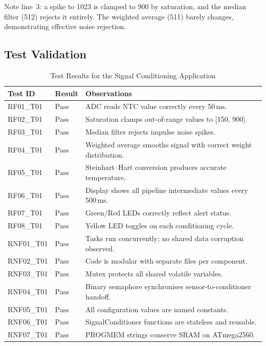 \documentclass[12pt]{article}
\begin{document}
Note line~3: a spike to 1023 is clamped to 900 by saturation, and the median filter (512) rejects it entirely. The weighted average (511) barely changes, demonstrating effective noise rejection.

\subsection{Test Validation}

\begin{table}[H]
\centering
\begin{tabular}{@{}llp{7.5cm}@{}}
\toprule
\textbf{Test ID} & \textbf{Result} & \textbf{Observations} \\
\midrule
RF01\_T01  & Pass & ADC reads NTC value correctly every 50\,ms. \\
RF02\_T01  & Pass & Saturation clamps out-of-range values to [150, 900]. \\
RF03\_T01  & Pass & Median filter rejects impulse noise spikes. \\
RF04\_T01  & Pass & Weighted average smooths signal with correct weight distribution. \\
RF05\_T01  & Pass & Steinhart--Hart conversion produces accurate temperature. \\
RF06\_T01  & Pass & Display shows all pipeline intermediate values every 500\,ms. \\
RF07\_T01  & Pass & Green/Red LEDs correctly reflect alert status. \\
RF08\_T01  & Pass & Yellow LED toggles on each conditioning cycle. \\
RNF01\_T01 & Pass & Tasks run concurrently; no shared data corruption observed. \\
RNF02\_T01 & Pass & Code is modular with separate files per component. \\
RNF03\_T01 & Pass & Mutex protects all shared volatile variables. \\
RNF04\_T01 & Pass & Binary semaphore synchronises sensor-to-conditioner handoff. \\
RNF05\_T01 & Pass & All configuration values are named constants. \\
RNF06\_T01 & Pass & SignalConditioner functions are stateless and reusable. \\
RNF07\_T01 & Pass & PROGMEM strings conserve SRAM on ATmega2560. \\
\bottomrule
\end{tabular}
\caption{Test Results for the Signal Conditioning Application}
\label{tab:tests}
\end{table}
\end{document}
